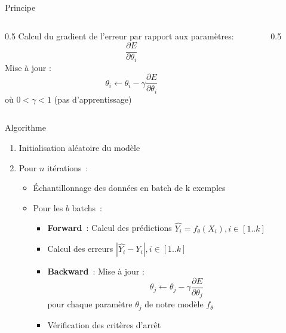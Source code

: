 
\begin{frame}{Principe}
  \begin{columns}
    \begin{column}{0.5\tw}
      Calcul du gradient de l'erreur par rapport aux paramètres:
      \[
        \frac{\partial{E}}{\partial{\theta_i}}
      \]
      Mise à jour :
      \[
        \theta_i \leftarrow \theta_i - \gamma\frac{\partial{E}}{\partial{\theta_i}}
      \]
      où $0 < \gamma < 1$ (pas d'apprentissage)
    \end{column}
    \begin{column}{0.5\tw}
    \end{column}
  \end{columns}
\end{frame}

\begin{frame}{Algorithme}
  \begin{enumerate}[<+->]
    \item Initialisation aléatoire du modèle
    \item Pour $n$ itérations~:
      \begin{itemize}
        \item Échantillonnage des données en batch de k exemples
        \item Pour les $b$ batchs~:
        \begin{itemize}
          \item \textbf{Forward}~: Calcul des prédictions $\hat{Y_i} = f_{\theta}(X_i), i\in[1..k]$
          \item Calcul des erreurs $|\hat{Y_i}-Y_i|, i\in[1..k]$
          \item \textbf{Backward}~: Mise à jour :
          \[
            \theta_j \leftarrow \theta_j - \gamma\frac{\partial{E}}{\partial{\theta_j}}
          \]
          pour chaque paramètre $\theta_j$ de notre modèle $f_\theta$ \\$\,$

          \item Vérification des critères d'arrêt
        \end{itemize}
      \end{itemize}
  \end{enumerate}
\end{frame}


